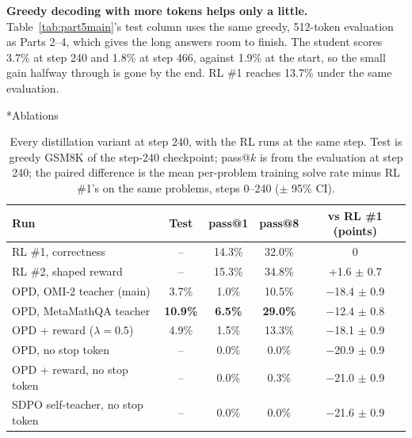 \documentclass[11pt]{article}
\makeatletter
\renewcommand\subsection{\@startsection{subsection}{2}{\z@}{0.6em}{0.2em}{\normalsize\bfseries}}
\makeatother
\begin{document}
\textbf{Greedy decoding with more tokens helps only a little.} Table~\ref{tab:part5main}'s test column uses the same greedy, 512-token evaluation as Parts 2--4, which gives the long answers room to finish. The student scores 3.7\% at step 240 and 1.8\% at step 466, against 1.9\% at the start, so the small gain halfway through is gone by the end. RL \#1 reaches 13.7\% under the same evaluation.

\subsection*{Ablations}

\begin{table}[H]
\centering
\small
\renewcommand{\arraystretch}{1.15}
\caption{Every distillation variant at step 240, with the RL runs at the same step. Test is greedy GSM8K of the step-240 checkpoint; pass@$k$ is from the evaluation at step 240; the paired difference is the mean per-problem training solve rate minus RL \#1's on the same problems, steps 0--240 ($\pm$ 95\% CI).}\label{tab:part5abl}
\begin{tabular}{l c cc c}
\toprule
\textbf{Run} & \textbf{Test} & \textbf{pass@1} & \textbf{pass@8} & \textbf{vs RL \#1 (points)} \\
\midrule
RL \#1, correctness & -- & 14.3\% & 32.0\% & 0 \\
RL \#2, shaped reward & -- & 15.3\% & 34.8\% & +1.6 $\pm$ 0.7 \\
OPD, OMI-2 teacher (main) & 3.7\% & 1.0\% & 10.5\% & $-$18.4 $\pm$ 0.9 \\
OPD, MetaMathQA teacher & \textbf{10.9\%} & \textbf{6.5\%} & \textbf{29.0\%} & $-$12.4 $\pm$ 0.8 \\
OPD + reward ($\lambda = 0.5$) & 4.9\% & 1.5\% & 13.3\% & $-$18.1 $\pm$ 0.9 \\
OPD, no stop token & -- & 0.0\% & 0.0\% & $-$20.9 $\pm$ 0.9 \\
OPD + reward, no stop token & -- & 0.0\% & 0.3\% & $-$21.0 $\pm$ 0.9 \\
SDPO self-teacher, no stop token & -- & 0.0\% & 0.0\% & $-$21.6 $\pm$ 0.9 \\
\bottomrule
\end{tabular}
\end{table}
\end{document}
